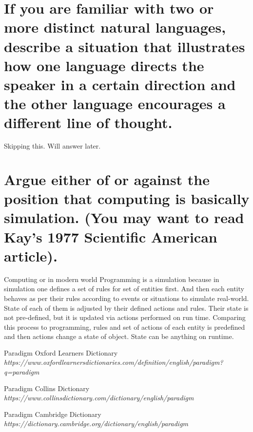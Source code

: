 \section{
  If you are familiar with two or more distinct natural languages, describe a
  situation that illustrates how one language directs the speaker in a certain
  direction and the other language encourages a different line of thought.
}

  Skipping this. Will answer later.

\section{
  Argue either of or against the position that computing is basically
  simulation. (You may want to read Kay's 1977 Scientific American article).
}

  Computing or in modern world Programming is a simulation because in
  simulation one defines a set of rules for set of entities first. And then
  each entity behaves as per their rules according to events or situations to
  simulate real-world. State of each of them is adjusted by their defined
  actions and rules. Their state is not pre-defined, but it is updated via
  actions performed on run time. Comparing this process to programming, rules
  and set of actions of each entity is predefined and then actions change a
  state of object. State can be anything on runtime.

\begin{thebibliography}{9}

    Paradigm Oxford Learners Dictionary
    \\\textit{
      https://www.oxfordlearnersdictionaries.com/definition/english/paradigm?q=paradigm
    }

    Paradigm Collins Dictionary
    \\\textit{
      https://www.collinsdictionary.com/dictionary/english/paradigm
    }

    Paradigm Cambridge Dictionary
    \\\textit{
      https://dictionary.cambridge.org/dictionary/english/paradigm
    }
  \end{thebibliography}
